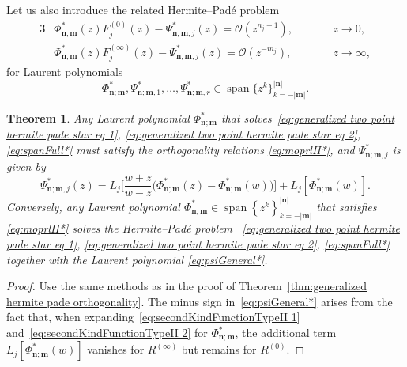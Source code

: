 \documentclass[reqno,centertags,11pt,draft]{amsart}
\newtheorem{thm}{Theorem}[section]
\newcommand{\abs}[1]{\left|#1\right|}
\newcommand{\set}[1]{\left\{#1\right\}}
\begin{document}
Let us  also introduce the related Hermite--Pad\'e problem
\begin{alignat}{3}
\label{eq:generalized two point hermite pade star eq 1}
    & \Phi_{\bm{n};\bm{m}}^*(z)F_j^{(0)}(z) -\Psi_{\bm{n};\bm{m},j}^*(z) = \mathcal{O}(z^{n_j+1}), \qquad &&z \rightarrow 0, \\\label{eq:generalized two point hermite pade star eq 2}
    & \Phi_{\bm{n};\bm{m}}^*(z)F_j^{(\infty)}(z) - \Psi_{\bm{n};\bm{m},j}^*(z) = \mathcal{O}(z^{-m_j}), \qquad &&z \rightarrow \infty,
\end{alignat}
for Laurent polynomials 
\begin{equation}\label{eq:spanFull*}
 \Phi_{\bm{n};\bm{m}}^*, \Psi_{\bm{n};\bm{m},1}^*, \ldots, \Psi_{\bm{n};\bm{m},r}^* \in \operatorname{span}\big\{z^k\big\}_{k = -\abs{\bm{m}}}^{\abs{\bm{n}}}.
\end{equation}
\begin{thm}
    Any Laurent polynomial $\Phi_{\bm{n};\bm{m}}^*$ that solves~\eqref{eq:generalized two point hermite pade star eq 1}, \eqref{eq:generalized two point hermite pade star eq 2}, \eqref{eq:spanFull*} must satisfy the orthogonality relations \eqref{eq:moprlII*}, and $\Psi_{\bm{n};\bm{m},j}^*$ is given by
    \begin{equation}\label{eq:psiGeneral*}
        \Psi_{\bm{n};\bm{m},j}^*(z) = L_j\Big[\frac{w+z}{w-z}\big(\Phi_{\bm{n};\bm{m}}^*(z) - \Phi_{\bm{n};\bm{m}}^*(w) \big)\Big] + L_j[\Phi_{\bm{n};\bm{m}}^*(w)].
    \end{equation}
     Conversely, any Laurent polynomial $\Phi^*_{\bm{n},\bm{m}} \in \operatorname{span}\set{z^k}_{k = -\abs{\bm{m}}}^{\abs{\bm{n}}}$ that satisfies \eqref{eq:moprlII*} solves the Hermite--Pad\'e problem ~\eqref{eq:generalized two point hermite pade star eq 1}, \eqref{eq:generalized two point hermite pade star eq 2}, \eqref{eq:spanFull*}   together with the Laurent polynomial \eqref{eq:psiGeneral*}.
\end{thm}

\begin{proof}
   Use the same methods as in the proof of Theorem~\ref{thm:generalized hermite pade orthogonality}.
    The minus sign in~\eqref{eq:psiGeneral*} arises from the fact that, when expanding~\eqref{eq:secondKindFunctionTypeII 1} and~\eqref{eq:secondKindFunctionTypeII 2} for $\Phi_{\bm{n};\bm{m}}^*$, the additional term $L_j[\Phi_{\bm{n};\bm{m}}^*(w)]$ vanishes for $R^{(\infty)}$ but remains for $R^{(0)}$.
\end{proof}
\end{document}

